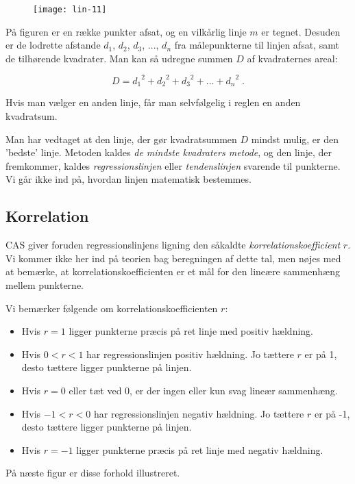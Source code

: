 \documentclass[12pt,oneside,a4paper]{article}
\begin{document}
\begin{figure}[H]
    \centering
    \texttt{[image: lin-11]}
\end{figure}

På figuren er en række punkter afsat, og en vilkårlig linje $m$ er tegnet.
Desuden er de lodrette afstande $d_1$, $d_2$, $d_3$, ..., $d_n$ fra
målepunkterne til linjen afsat, samt de tilhørende kvadrater. Man kan så
udregne summen $D$ af kvadraternes areal:

\[
D = {d_1}^2 + {d_2}^2 + {d_3}^2 + \ldots + {d_n}^2 \; . 
\]

Hvis man vælger en anden linje, får man selvfølgelig i reglen en anden kvadratsum.

Man har vedtaget at den linje, der gør kvadratsummen $D$ mindst mulig, er den
'bedste' linje. Metoden kaldes {\em de mindste kvadraters metode}, og den linje, der
fremkommer, kaldes {\em regressionslinjen} eller {\em tendenslinjen} svarende
til punkterne. Vi går ikke ind på, hvordan linjen matematisk bestemmes. 

\subsection{Korrelation}
CAS giver foruden regressionslinjens ligning den såkaldte {\em
korrelations\-koef\-fi\-cient} $r$. Vi kommer ikke her ind på teorien bag
beregningen af dette tal, men nøjes med at bemærke, at
korrelationskoefficienten er et mål for den lineære sammenhæng mellem
punkterne.

Vi bemærker følgende om korrelationskoefficienten $r$:

\begin{itemize}
    \item Hvis $r = 1$ ligger punkterne præcis på ret linje med positiv hældning.
    \item Hvis $0 < r < 1$ har regressionslinjen positiv hældning. Jo tættere $r$
        er på 1, desto tættere ligger punkterne på linjen.
    \item Hvis $r = 0$ eller tæt ved 0, er der ingen eller kun svag lineær sammenhæng.
    \item Hvis $-1 < r < 0$ har regressionslinjen negativ hældning. Jo tættere $r$
        er på -1, desto tættere ligger punkterne på linjen.
    \item Hvis $r = -1$ ligger punkterne præcis på ret linje med negativ hældning. 
\end{itemize}
På næste figur er disse forhold illustreret.
\end{document}

